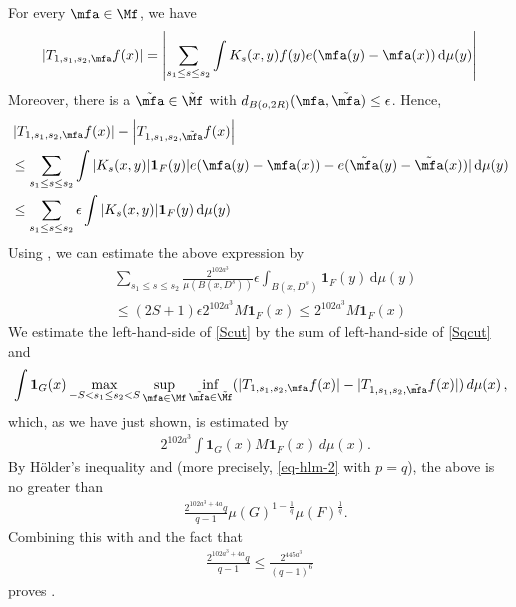 For every $\mfa\in \Mf$, we have
\begin{equation}
\left| T_{1, s_1,s_2,\mfa} f(x)\right|=
\left|\sum_{s_1 \le s\le s_2}
\int K_s(x,y) f(y) e(\mfa(y)-{\mfa(x)}) \, \mathrm{d}\mu(y)\right|
\end{equation}
Moreover, there is a $\tilde{\mfa}
\in \tilde{\Mf}$ with $d_{B(o,2R)}(\mfa,\tilde{\mfa})\le \epsilon$. Hence,
\begin{align*}
    &\left| T_{1, s_1,s_2,\mfa} f(x)\right|-\left|T_{1, s_1,s_2,\tilde{\mfa}} f(x) \right|\\
  &\leq\sum_{s_1 \le s\le s_2} \int |K_s(x,y)| \mathbf{1}_F(y) |e(\mfa(y)-{\mfa(x)})-e({\tilde{\mfa}(y)}-{\tilde{\mfa}(x)})| \, \mathrm{d}\mu(y)\\
    &\leq \sum_{s_1 \le s\le s_2} \epsilon \int |K_s(x,y)| \mathbf{1}_F(y) \, \mathrm{d}\mu(y)
\end{align*}
Using , we can estimate the above expression by
\begin{align*}
    &\sum_{s_1 \le s\le s_2} \frac{2^{102 a^3}}{\mu(B(x, D^{s}))}
\epsilon \int_{B(x, D^s)} \mathbf{1}_F(y) \, \mathrm{d}\mu(y)\\
    &\leq (2S+1)\epsilon 2^{102 a^3} M\mathbf{1}_F(x)\le 2^{102 a^3}M\mathbf{1}_F(x)
\end{align*}
We estimate the left-hand-side of \eqref{Scut} by
the sum of left-hand-side of \eqref{Sqcut} and
\begin{align*}
    &\int \mathbf{1}_{G}(x)
\max_{-S<s_1\le s_2<S}\sup_{\mfa\in {\Mf}}
\inf_{\tilde{\mfa}\in\tilde{\Mf}}
(| T_{1, s_1,s_2,\mfa}f(x)|-|T_{1, s_1,s_2,\tilde{\mfa}}f(x) |)\, d\mu(x)\,,\\
\end{align*}
which, as we have just shown, is estimated by
\begin{align*}
     &2^{102 a^3}\int \mathbf{1}_{G}(x)
M\mathbf{1}_{F}(x)\, d\mu(x).
\end{align*}
By H\"older's inequality and 
 (more precisely, \eqref{eq-hlm-2} with $p=q$), the above is no greater than
\begin{align*}
&\frac{2^{102 a^3+4a}q}{q-1} \mu(G)^{1-\frac{1}{q}} \mu(F)^{\frac{1}{q}}.
\end{align*}
Combining this with  and the fact that
\begin{align*}
    \frac{2^{102 a^3+4a}q}{q-1}\leq \frac{2^{445a^3}}{(q-1)^6}
\end{align*}
proves .

